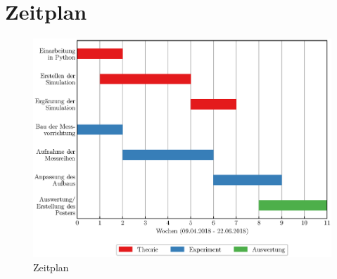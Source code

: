 \section{Zeitplan}
\begin{figure}[h!]
    \centering
    \includegraphics[width=\textwidth]{timetable}
    \caption{Zeitplan}
    \label{abb:2}
\end{figure}
